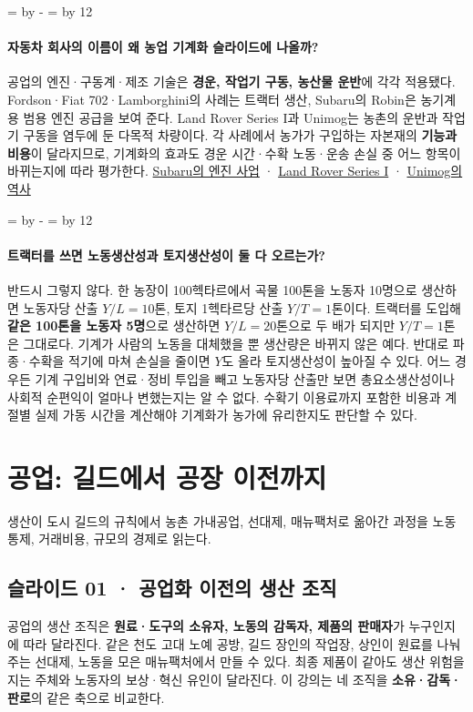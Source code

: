 \documentclass[10pt,a4paper]{article}
\newcommand{\ReserveQuestionSpace}{%
  \par\begingroup
  \dimen0=\pagegoal \advance\dimen0 by -\pagetotal
  \dimen2=\baselineskip \multiply\dimen2 by 12
  \ifdim\dimen0<\dimen2 \newpage\fi
  \endgroup}
\begin{document}
\ReserveQuestionSpace
\paragraph{자동차 회사의 이름이 왜 농업 기계화 슬라이드에 나올까?}
공업의 엔진·구동계·제조 기술은 \textbf{경운, 작업기 구동, 농산물 운반}에 각각 적용됐다. Fordson·Fiat 702·Lamborghini의 사례는 트랙터 생산, Subaru의 Robin은 농기계용 범용 엔진 공급을 보여 준다. Land Rover Series I과 Unimog는 농촌의 운반과 작업기 구동을 염두에 둔 다목적 차량이다. 각 사례에서 농가가 구입하는 자본재의 \textbf{기능과 비용}이 달라지므로, 기계화의 효과도 경운 시간·수확 노동·운송 손실 중 어느 항목이 바뀌는지에 따라 평가한다. \href{https://www.subaru.co.jp/en/news/archives/press/2001/01\_05\_14.htm}{Subaru의 엔진 사업} · \href{https://www.lrheritagecollection.org.uk/the-collection/vehicles/00i-03}{Land Rover Series I} · \href{https://group.mercedes-benz.com/company/tradition/company-history/1949-1960.html}{Unimog의 역사}\par

\ReserveQuestionSpace
\paragraph{트랙터를 쓰면 노동생산성과 토지생산성이 둘 다 오르는가?}
반드시 그렇지 않다. 한 농장이 100헥타르에서 곡물 100톤을 노동자 10명으로 생산하면 노동자당 산출 $Y/L=10$톤, 토지 1헥타르당 산출 $Y/T=1$톤이다. 트랙터를 도입해 \textbf{같은 100톤을 노동자 5명}으로 생산하면 $Y/L=20$톤으로 두 배가 되지만 $Y/T=1$톤은 그대로다. 기계가 사람의 노동을 대체했을 뿐 생산량은 바뀌지 않은 예다. 반대로 파종·수확을 적기에 마쳐 손실을 줄이면 $Y$도 올라 토지생산성이 높아질 수 있다. 어느 경우든 기계 구입비와 연료·정비 투입을 빼고 노동자당 산출만 보면 총요소생산성이나 사회적 순편익이 얼마나 변했는지는 알 수 없다. 수확기 이용료까지 포함한 비용과 계절별 실제 가동 시간을 계산해야 기계화가 농가에 유리한지도 판단할 수 있다.\par

\section{공업: 길드에서 공장 이전까지}
생산이 도시 길드의 규칙에서 농촌 가내공업, 선대제, 매뉴팩처로 옮아간 과정을 노동 통제, 거래비용, 규모의 경제로 읽는다.\par

\subsection{슬라이드 01 · 공업화 이전의 생산 조직}
공업의 생산 조직은 \textbf{원료·도구의 소유자, 노동의 감독자, 제품의 판매자}가 누구인지에 따라 달라진다. 같은 천도 고대 노예 공방, 길드 장인의 작업장, 상인이 원료를 나눠 주는 선대제, 노동을 모은 매뉴팩처에서 만들 수 있다. 최종 제품이 같아도 생산 위험을 지는 주체와 노동자의 보상·혁신 유인이 달라진다. 이 강의는 네 조직을 \textbf{소유·감독·판로}의 같은 축으로 비교한다.\par
\end{document}
